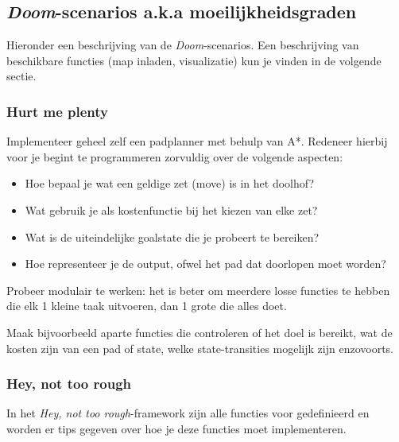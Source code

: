 \documentclass[a4paper]{article}
\begin{document}
\subsection{\textit{Doom}-scenarios a.k.a moeilijkheidsgraden}
Hieronder een beschrijving van de \textit{Doom}-scenarios. Een beschrijving van beschikbare functies (map inladen, visualizatie) kun je vinden in de volgende sectie.

\subsubsection{Hurt me plenty}
Implementeer geheel zelf een padplanner met behulp van A*. Redeneer hierbij voor je begint te programmeren zorvuldig over de volgende aspecten:
\begin{itemize}
\item Hoe bepaal je wat een geldige zet (move) is in het doolhof?
\item Wat gebruik je als kostenfunctie bij het kiezen van elke zet?
\item Wat is de uiteindelijke goalstate die je probeert te bereiken?
\item Hoe representeer je de output, ofwel het pad dat doorlopen moet worden? 
\end{itemize}

Probeer modulair te werken: het is beter om meerdere losse functies te hebben die elk 1 kleine taak uitvoeren, dan 1 grote die alles doet.

Maak bijvoorbeeld aparte functies die controleren of het doel is bereikt, wat de kosten zijn van een pad of state, welke state-transities mogelijk zijn enzovoorts. 

\subsubsection{Hey, not too rough}
In het \textit{Hey, not too rough}-framework zijn alle functies voor gedefinieerd en worden er tips gegeven over hoe je deze functies moet implementeren.
\end{document}
